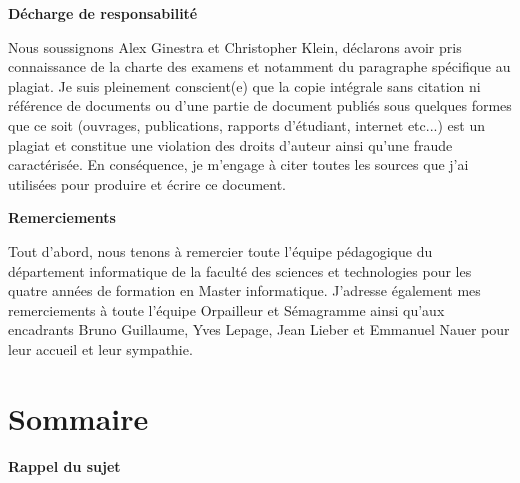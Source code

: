 \documentclass{article}
\begin{document}
\thispagestyle{empty}
\begin{center}
{\bfseries \huge D\'echarge de responsabilit\'e}
\end{center}
\vspace*{10mm}

Nous soussignons Alex Ginestra et Christopher Klein, d\'eclarons avoir pris connaissance de la charte des examens et notamment du paragraphe sp\'ecifique au plagiat.\newline
Je suis pleinement conscient(e) que la copie int\'egrale sans citation ni r\'ef\'erence de documents ou d'une partie de document publi\'es sous quelques formes que ce soit (ouvrages, publications, rapports d'\'etudiant, internet etc...) est un plagiat et constitue une violation des droits d'auteur ainsi qu'une fraude caract\'eris\'ee.\newline
En cons\'equence, je m'engage \`{a} citer toutes les sources que j'ai utilis\'ees pour produire et \'ecrire ce document.
\cleardoublepage


\thispagestyle{empty}
\begin{center}
{\bfseries \huge Remerciements}
\end{center}
\vspace*{10mm}

Tout d'abord, nous tenons \`{a} remercier toute l'\'equipe p\'edagogique du d\'epartement informatique de la facult\'e des sciences et technologies pour les quatre ann\'ees de formation en Master informatique.\newline
J'adresse \'egalement mes remerciements \`{a} toute l'\'equipe Orpailleur et S\'emagramme ainsi qu'aux encadrants Bruno Guillaume, Yves Lepage, Jean Lieber et Emmanuel Nauer pour leur accueil et leur sympathie.

\cleardoublepage


\section{Sommaire}
\setcounter{page}{3}

\cleardoublepage

\begin{center}
{\bfseries \huge Rappel du sujet}
\end{center}

\vspace*{10mm}
\end{document}
